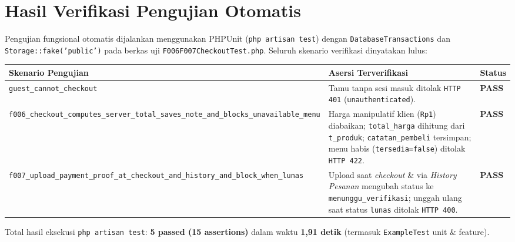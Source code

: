 \documentclass[11pt,a4paper]{article}
\begin{document}
\section{Hasil Verifikasi Pengujian Otomatis}

Pengujian fungsional otomatis dijalankan menggunakan PHPUnit (\texttt{php artisan test}) dengan \texttt{DatabaseTransactions} dan \texttt{Storage::fake('public')} pada berkas uji \texttt{F006F007CheckoutTest.php}. Seluruh skenario verifikasi dinyatakan lulus:

\renewcommand{\arraystretch}{1.20}
\begin{tabularx}{\textwidth}{|L{5.2cm}|Y|C{1.8cm}|}
\hline
{}
\textbf{Skenario Pengujian} & \textbf{Asersi Terverifikasi} & \textbf{Status} \\
\hline
\texttt{guest\_cannot\_checkout} & Tamu tanpa sesi masuk ditolak \texttt{HTTP 401} (\texttt{unauthenticated}). & \textcolor{JajanGreen}{\textbf{PASS}} \\
\hline
\texttt{f006\_checkout\_computes\_\allowbreak server\_total\_saves\_note\_\allowbreak and\_blocks\_unavailable\_menu} & Harga manipulatif klien (\texttt{Rp1}) diabaikan; \texttt{total\_harga} dihitung dari \texttt{t\_produk}; \texttt{catatan\_pembeli} tersimpan; menu habis (\texttt{tersedia=false}) ditolak \texttt{HTTP 422}. & \textcolor{JajanGreen}{\textbf{PASS}} \\
\hline
\texttt{f007\_upload\_payment\_proof\_\allowbreak at\_checkout\_and\_history\_\allowbreak and\_block\_when\_lunas} & Upload saat \textit{checkout} \& via \textit{History Pesanan} mengubah status ke \texttt{menunggu\_verifikasi}; unggah ulang saat status \texttt{lunas} ditolak \texttt{HTTP 400}. & \textcolor{JajanGreen}{\textbf{PASS}} \\
\hline
\end{tabularx}

\vspace{0.25cm}
\noindent Total hasil eksekusi \texttt{php artisan test}: \textbf{5 passed (15 assertions)} dalam waktu \textbf{1,91 detik} (termasuk \texttt{ExampleTest} unit \& feature).
\end{document}
